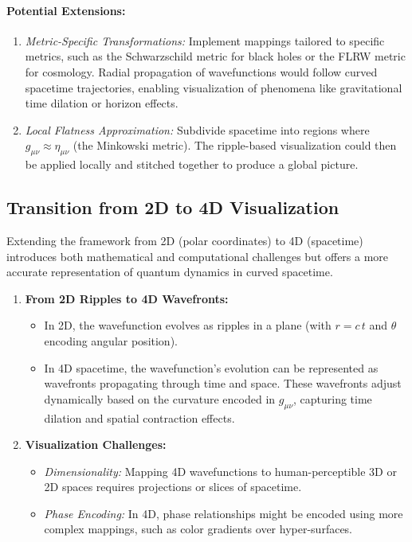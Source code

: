 \documentclass{article}
\begin{document}
\paragraph{Potential Extensions:}
\begin{enumerate}
    \item \textit{Metric-Specific Transformations:} 
    Implement mappings tailored to specific metrics, such as the Schwarzschild metric for black holes or the FLRW metric for cosmology. Radial propagation of wavefunctions would follow curved spacetime trajectories, enabling visualization of phenomena like gravitational time dilation or horizon effects.

    \item \textit{Local Flatness Approximation:} 
    Subdivide spacetime into regions where \(g_{\mu\nu} \approx \eta_{\mu\nu}\) (the Minkowski metric). The ripple-based visualization could then be applied locally and stitched together to produce a global picture.
\end{enumerate}

\subsection{Transition from 2D to 4D Visualization}
Extending the framework from 2D (polar coordinates) to 4D (spacetime) introduces both mathematical and computational challenges but offers a more accurate representation of quantum dynamics in curved spacetime.

\begin{enumerate}
    \item \textbf{From 2D Ripples to 4D Wavefronts:}
    \begin{itemize}
        \item In 2D, the wavefunction evolves as ripples in a plane (with \(r = c\,t\) and \(\theta\) encoding angular position).
        \item In 4D spacetime, the wavefunction’s evolution can be represented as wavefronts propagating through time and space. These wavefronts adjust dynamically based on the curvature encoded in \(g_{\mu\nu}\), capturing time dilation and spatial contraction effects.
    \end{itemize}

    \item \textbf{Visualization Challenges:}
    \begin{itemize}
        \item \textit{Dimensionality:} Mapping 4D wavefunctions to human-perceptible 3D or 2D spaces requires projections or slices of spacetime.
        \item \textit{Phase Encoding:} In 4D, phase relationships might be encoded using more complex mappings, such as color gradients over hyper-surfaces.
    \end{itemize}
\end{enumerate}
\end{document}
